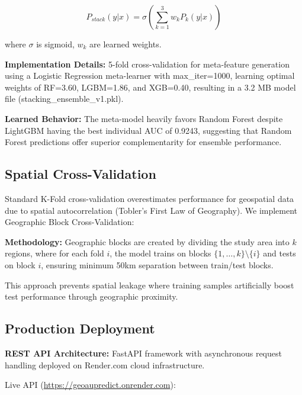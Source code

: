 \documentclass[12pt,a4paper]{article}
\begin{document}
\begin{equation}
P_{stack}(y|x) = \sigma\left(\sum_{k=1}^{3} w_k P_k(y|x)\right)
\end{equation}

where $\sigma$ is sigmoid, $w_k$ are learned weights.

\textbf{Implementation Details:} 5-fold cross-validation for meta-feature generation using a Logistic Regression meta-learner with max\_iter=1000, learning optimal weights of RF=3.60, LGBM=1.86, and XGB=0.40, resulting in a 3.2 MB model file (stacking\_ensemble\_v1.pkl).

\textbf{Learned Behavior:} The meta-model heavily favors Random Forest despite LightGBM having the best individual AUC of 0.9243, suggesting that Random Forest predictions offer superior complementarity for ensemble performance.

\subsection{Spatial Cross-Validation}

Standard K-Fold cross-validation overestimates performance for geospatial data due to spatial autocorrelation (Tobler's First Law of Geography). We implement Geographic Block Cross-Validation:

\textbf{Methodology:}
Geographic blocks are created by dividing the study area into $k$ regions, where for each fold $i$, the model trains on blocks $\{1, \ldots, k\} \setminus \{i\}$ and tests on block $i$, ensuring minimum 50km separation between train/test blocks.

This approach prevents spatial leakage where training samples artificially boost test performance through geographic proximity.

\subsection{Production Deployment}

\textbf{REST API Architecture:} FastAPI framework with asynchronous request handling deployed on Render.com cloud infrastructure.

Live API (\url{https://geoaupredict.onrender.com}):
\end{document}
